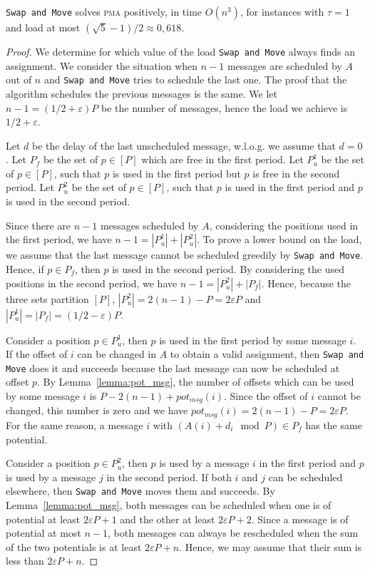 \documentclass[a4paper,UKenglish,cleveref, autoref, thm-restate]{lipics-v2019}
\newcommand\pma{\textsc{pma}\xspace}
\newcommand\swapandmove{\texttt{Swap and Move}\xspace}
\begin{document}
\begin{theorem}
\swapandmove solves \pma positively, in time $O(n^3)$, for instances with $\tau =1$ and load at most $(\sqrt{5}-1)/2 \approx 0,618$.
\end{theorem}

\begin{proof}
We determine for which value of the load \swapandmove always finds an assignment.
We consider the situation when $n-1$ messages are scheduled by $A$ out of $n$ and \swapandmove tries to schedule the last one. The proof that the algorithm schedules the previous messages is the same. We let $n - 1 = (1/2 + \varepsilon)P$ be the number of messages, hence the load we achieve is $1/2 + \varepsilon$. 

Let $d$ be the delay of the last unscheduled message, w.l.o.g. we assume that $d = 0$. 
Let $P_f$ be the set of $p\in [P]$ which are free in the first period. Let $P^1_{u}$ be the set of $p\in [P]$, such that $p$ is used in the first period but $p$ is free in the second period. Let $P^2_{u}$ be the set of $p\in [P]$, such that $p$ is used in the first period and $p$ is used in the second period. 

Since there are $n-1$ messages scheduled by $A$, considering the positions used in the first period, we have $n-1 = |P^1_u| + |P^2_u|$.
To prove a lower bound on the load, we assume that the last message cannot be scheduled greedily by \swapandmove. Hence, if $p\in P_f$, then $p$ is used in the second period. By considering the used positions in the second period, we have $n - 1 = |P^2_u| + |P_f|$.
Hence, because the three sets partition $[P]$, $|P^2_u| = 2(n-1) - P = 2\varepsilon P$ and $|P^1_u| = |P_f| = (1/2 - \varepsilon)P$.

Consider a position $p \in P^1_u$, then $p$ is used in the first period by some message $i$.
If the offset of $i$ can be changed in $A$ to obtain a valid assignment, then \swapandmove does it and succeeds because the last message can now be scheduled at offset $p$.
By Lemma~\ref{lemma:pot_msg}, the number of offsets which can be used by some message $i$ is $P- 2(n-1) + pot_{msg}(i)$. Since the offset of $i$ cannot be changed, this number is zero and we have $pot_{msg}(i) = 2(n-1) - P = 2\varepsilon P$. For the same reason, a message $i$ with $(A(i) + d_i \mod P) \in P_f$ has the same potential.

Consider a position $p \in P^2_u$, then $p$ is used by a message $i$ in the first period and $p$ is used by a message $j$ in the second period. If both $i$ and $j$ can be scheduled elsewhere, then \swapandmove moves them and succeeds. 
By Lemma~\ref{lemma:pot_msg}, both messages can be scheduled when one is of potential at least $2\varepsilon P + 1$ and the other at least $2\varepsilon P + 2$. 
Since a message is of potential at most $n-1$, both messages can always be rescheduled when the sum of the two potentials is at least $2\varepsilon P + n$. Hence, we may assume that their sum is less than $2 \varepsilon P + n$. 


\end{proof}
\end{document}
